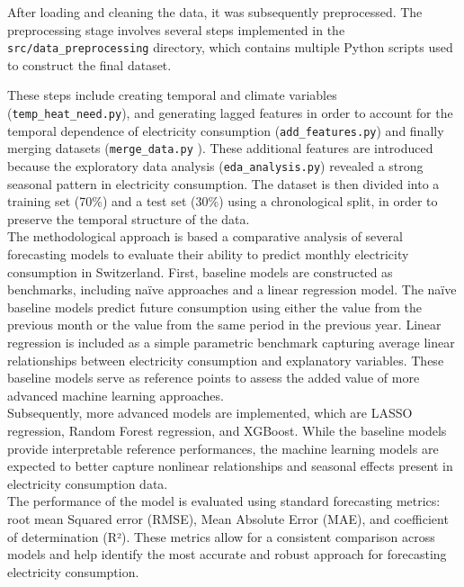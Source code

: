 \documentclass[11pt,a4paper]{article}
\begin{document}
After loading and cleaning the data, it was subsequently preprocessed.
The preprocessing stage involves several steps implemented in the \texttt{src/data\_preprocessing} directory, which contains multiple Python scripts used to construct the final dataset. 

These steps include creating temporal and climate variables (\texttt{temp\_heat\_need.py}), and generating lagged features in order to account for the temporal dependence of electricity consumption (\texttt{add\_features.py}) and finally merging datasets (\texttt{merge\_data.py} ). These additional features are introduced because the exploratory data analysis (\texttt{eda\_analysis.py}) revealed a strong seasonal pattern in electricity consumption. The dataset is then divided into a training set (70\%) and a test set (30\%) using a chronological split, in order to preserve the temporal structure of the data.\\

The methodological approach is based a comparative analysis of several forecasting models to evaluate their ability to predict monthly electricity consumption in Switzerland. First, baseline models are constructed as benchmarks, including naïve approaches and a linear regression model. The naïve baseline models predict future consumption using either the value from the previous month or the value from the same period in the previous year. Linear regression is included as a simple parametric benchmark capturing average linear relationships between electricity consumption and explanatory variables. These baseline models serve as reference points to assess the added value of more advanced machine learning approaches.\\

Subsequently, more advanced models are implemented, which are LASSO regression, Random Forest regression, and XGBoost. While the baseline models provide interpretable reference performances, the machine learning models are expected to better capture nonlinear relationships and seasonal effects present in electricity consumption data.\\

The performance of the model is evaluated using standard forecasting metrics: root mean Squared error (RMSE), Mean Absolute Error (MAE), and coefficient of determination (R²). These metrics allow for a consistent comparison across models and help identify the most accurate and robust approach for forecasting electricity consumption.
\end{document}
